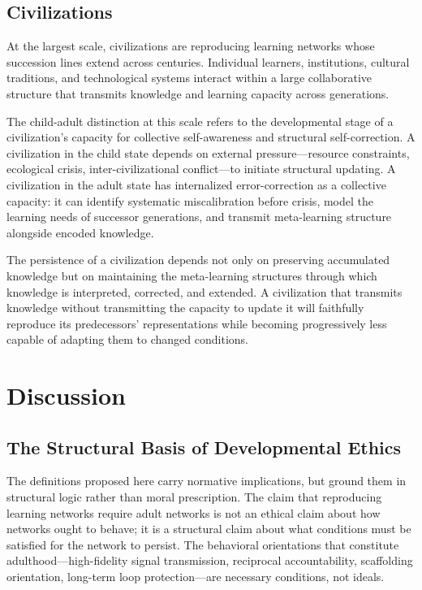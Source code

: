 \documentclass[11pt]{article}
\begin{document}
\subsection{Civilizations}

At the largest scale, civilizations are reproducing learning networks whose succession lines
extend across centuries. Individual learners, institutions, cultural traditions, and technological
systems interact within a large collaborative structure that transmits knowledge and learning
capacity across generations.

The child-adult distinction at this scale refers to the developmental stage of a civilization's
capacity for collective self-awareness and structural self-correction. A civilization in the
child state depends on external pressure---resource constraints, ecological crisis, inter-civilizational
conflict---to initiate structural updating. A civilization in the adult state has internalized
error-correction as a collective capacity: it can identify systematic miscalibration before
crisis, model the learning needs of successor generations, and transmit meta-learning structure
alongside encoded knowledge.

The persistence of a civilization depends not only on preserving accumulated knowledge but on
maintaining the meta-learning structures through which knowledge is interpreted, corrected, and
extended. A civilization that transmits knowledge without transmitting the capacity to update it
will faithfully reproduce its predecessors' representations while becoming progressively less
capable of adapting them to changed conditions.

\section{Discussion}

\subsection{The Structural Basis of Developmental Ethics}

The definitions proposed here carry normative implications, but ground them in structural logic
rather than moral prescription. The claim that reproducing learning networks require adult
networks is not an ethical claim about how networks ought to behave; it is a structural claim
about what conditions must be satisfied for the network to persist. The behavioral orientations
that constitute adulthood---high-fidelity signal transmission, reciprocal accountability,
scaffolding orientation, long-term loop protection---are necessary conditions, not ideals.
\end{document}
